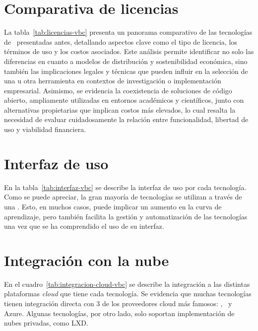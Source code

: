 \section{Comparativa de licencias}
\noindent
La tabla~\ref{tab:licencias-vbc} presenta un panorama comparativo de las tecnologías de \VBC\ presentadas antes, detallando aspectos clave como el tipo de licencia, los términos de uso y los costos asociados. Este análisis permite identificar no solo las diferencias en cuanto a modelos de distribución y sostenibilidad económica, sino también las implicaciones legales y técnicas que pueden influir en la selección de una u otra herramienta en contextos de investigación o implementación empresarial. Asimismo, se evidencia la coexistencia de soluciones de código abierto, ampliamente utilizadas en entornos académicos y científicos, junto con alternativas propietarias que implican costos más elevados, lo cual resalta la necesidad de evaluar cuidadosamente la relación entre funcionalidad, libertad de uso y viabilidad financiera.


\section{Interfaz de uso}
\noindent
En la tabla~\ref{tab:interfaz-vbc} se describe la interfaz de uso por cada tecnología. Como se puede apreciar, la gran mayoría de tecnologías se utilizan a través de una \CLI. Esto, en muchos casos, puede implicar un aumento en la curva de aprendizaje, pero también facilita la gestión y automatización de las tecnologías una vez que se ha comprendido el uso de su interfaz.


\section{Integración con la nube}
\noindent
En el cuadro~\ref{tab:integracion-cloud-vbc} se describe la integración a las distintas plataformas \textit{cloud} que tiene cada tecnología. Se evidencia que muchas tecnologías tienen integración directa con 3 de los proveedores cloud más famosos: \AWS, \GCP\ y Azure. Algunas tecnologías, por otro lado, solo soportan implementación de nubes privadas, como LXD.\@


\clearpage

